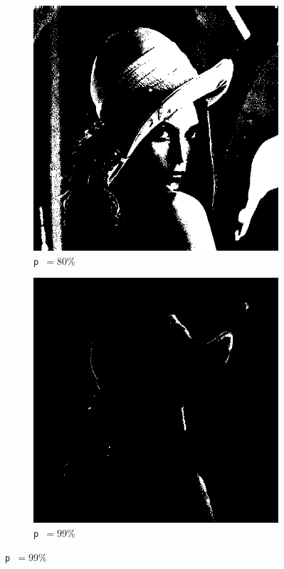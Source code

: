\documentclass[12pt]{article}
\begin{document}
\begin{figure}[H]
      \vspace{0.02\textwidth}

      \begin{subfigure}[b]{0.33\textwidth}
        \centering
        \includegraphics[width=\textwidth]{img/lena-threshold-80.png}
        \caption*{\texttt{p }\( = 80\%\)}
      \end{subfigure}
      \hspace{0.15\textwidth}
      \begin{subfigure}[b]{0.33\textwidth}
        \centering
        \includegraphics[width=\textwidth]{img/lena-threshold-99.png}
        \caption*{\texttt{p }\( = 99\%\)}
      \end{subfigure}
    \end{figure}
\end{document}
